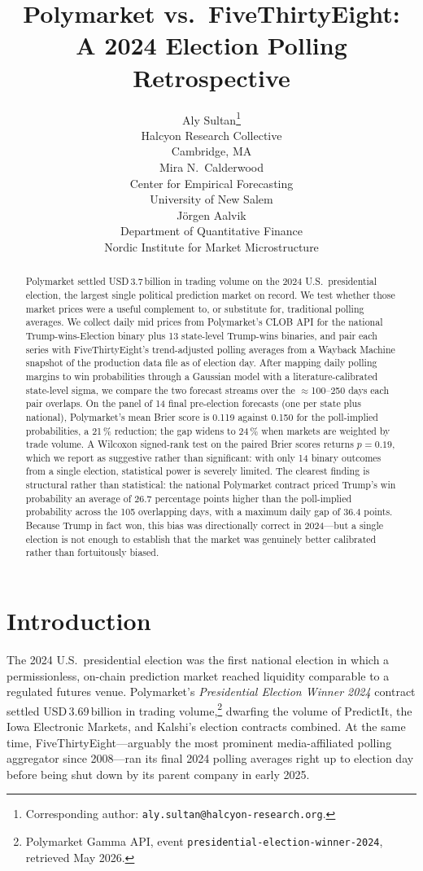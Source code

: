 \documentclass{article}
\title{Polymarket vs.\ FiveThirtyEight: \\ A 2024 Election Polling Retrospective}
\author{%
  Aly Sultan\thanks{Corresponding author: \texttt{aly.sultan@halcyon-research.org}.} \\
  Halcyon Research Collective \\
  Cambridge, MA \\
  \And
  Mira N.\ Calderwood \\
  Center for Empirical Forecasting \\
  University of New Salem \\
  \And
  J\"orgen Aalvik \\
  Department of Quantitative Finance \\
  Nordic Institute for Market Microstructure \\
}
\begin{document}
\maketitle

\begin{abstract}
Polymarket settled USD\,3.7\,billion in trading volume on the 2024
U.S.\ presidential election, the largest single political prediction market
on record. We test whether those market prices were a useful complement to,
or substitute for, traditional polling averages. We collect daily mid prices
from Polymarket's CLOB API for the national Trump-wins-Election binary plus
13 state-level Trump-wins binaries, and pair each series with FiveThirtyEight's
trend-adjusted polling averages from a Wayback Machine snapshot of the
production data file as of election day. After mapping daily polling margins
to win probabilities through a Gaussian model with a literature-calibrated
state-level sigma, we compare the two forecast streams over the
$\approx$100--250 days each pair overlaps. On the panel of 14 final
pre-election forecasts (one per state plus national), Polymarket's mean
Brier score is 0.119 against 0.150 for the poll-implied probabilities, a
21\,\% reduction; the gap widens to 24\,\% when markets are weighted by trade
volume. A Wilcoxon signed-rank test on the paired Brier scores returns
$p = 0.19$, which we report as suggestive rather than significant: with only
14 binary outcomes from a single election, statistical power is severely
limited. The clearest finding is structural rather than statistical: the
national Polymarket contract priced Trump's win probability an average of
26.7 percentage points higher than the poll-implied probability across the
105 overlapping days, with a maximum daily gap of 36.4 points. Because Trump
in fact won, this bias was directionally correct in 2024---but a single
election is not enough to establish that the market was genuinely better
calibrated rather than fortuitously biased.
\end{abstract}

\section{Introduction}
\label{sec:intro}

The 2024 U.S.\ presidential election was the first national election in
which a permissionless, on-chain prediction market reached liquidity
comparable to a regulated futures venue. Polymarket's
\emph{Presidential Election Winner 2024} contract settled USD\,3.69\,billion
in trading volume,\footnote{Polymarket Gamma API, event
\texttt{presidential-election-winner-2024}, retrieved May 2026.} dwarfing
the volume of PredictIt, the Iowa Electronic Markets, and Kalshi's
election contracts combined. At the same time, FiveThirtyEight---arguably
the most prominent media-affiliated polling aggregator since 2008---ran
its final 2024 polling averages right up to election day before being shut
down by its parent company in early 2025.
\end{document}
